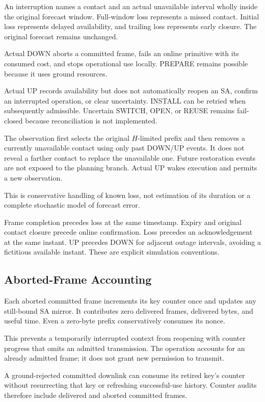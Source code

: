 \documentclass[conference]{IEEEtran}
\begin{document}
An interruption names a contact and an actual unavailable
interval wholly inside the original forecast window.
Full-window loss represents a missed contact.
Initial loss represents delayed availability, and trailing
loss represents early closure.
The original forecast remains unchanged.

Actual DOWN aborts a committed frame, fails an online
primitive with its consumed cost, and stops operational use
locally.
PREPARE remains possible because it uses ground resources.

Actual UP records availability but does not automatically
reopen an SA, confirm an interrupted operation, or clear
uncertainty.
INSTALL can be retried when subsequently admissible.
Uncertain SWITCH, OPEN, or REUSE remains fail-closed because
reconciliation is not implemented.

The observation first selects the original $H$-limited prefix
and then removes a currently unavailable contact using only
past DOWN/UP events.
It does not reveal a farther contact to replace the unavailable
one.
Future restoration events are not exposed to the planning
branch.
Actual UP wakes execution and permits a new observation.

This is conservative handling of known loss, not estimation
of its duration or a complete stochastic model of forecast error.

Frame completion precedes loss at the same timestamp.
Expiry and original contact closure precede online confirmation.
Loss precedes an acknowledgement at the same instant.
UP precedes DOWN for adjacent outage intervals, avoiding
a fictitious available instant.
These are explicit simulation conventions.

\subsection{Aborted-Frame Accounting}

Each aborted committed frame increments its key counter once
and updates any still-bound SA mirror.
It contributes zero delivered frames, delivered bytes,
and useful time.
Even a zero-byte prefix conservatively consumes its nonce.

This prevents a temporarily interrupted context from reopening
with counter progress that omits an admitted transmission.
The operation accounts for an already admitted frame;
it does not grant new permission to transmit.

A ground-rejected committed downlink can consume its retired
key's counter without resurrecting that key or refreshing
successful-use history.
Counter audits therefore include delivered and aborted
committed frames.
\end{document}
